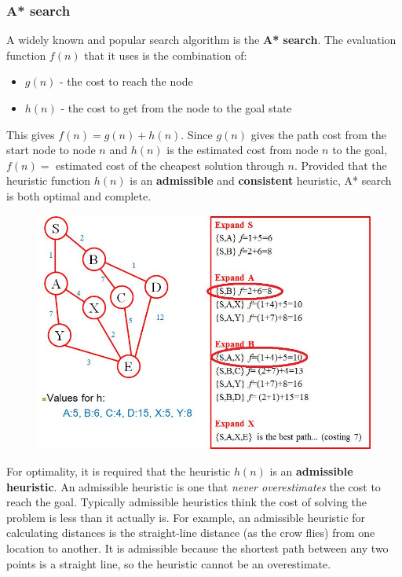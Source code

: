 \documentclass{article}
\begin{document}
\subsubsection{A* search}
A widely known and popular search algorithm is the \textbf{A* search}. The evaluation function $f(n)$ that it uses is the combination of:
\begin{itemize}
\item $g(n)$ - the cost to reach the node
\item $h(n)$ - the cost to get from the node to the goal state
\end{itemize} 
This gives $f(n) = g(n) + h(n)$. Since $g(n)$ gives the path cost from the start node to node $n$ and $h(n)$ is the estimated cost from node $n$ to the goal, $f(n) = $ estimated cost of the cheapest solution through $n$. Provided that the heuristic function $h(n)$ is an \textbf{admissible} and \textbf{consistent} heuristic, A* search is both optimal and complete.
\begin{figure}[H]
\centering
\includegraphics[width=1\textwidth, keepaspectratio]{imgs/a-star.jpg}
\end{figure}
\noindent
For optimality, it is required that the heuristic $h(n)$ is an \textbf{admissible heuristic}. An admissible heuristic is one that \textit{never overestimates} the cost to reach the goal. Typically admissible heuristics think the cost of solving the problem is less than it actually is. For example, an admissible heuristic for calculating distances is the straight-line distance (as the crow flies) from one location to another. It is admissible because the shortest path between any two points is a straight line, so the heuristic cannot be an overestimate.
\end{document}
